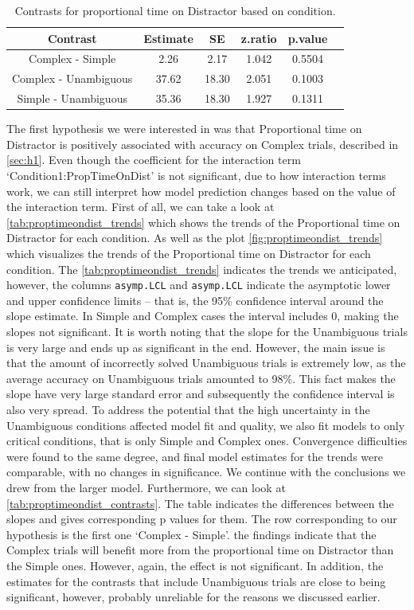 \begin{table}[h!]
\centering
\begin{tabular}{|c|c|c|c|c|c|}
\hline
\textbf{Contrast} & \textbf{Estimate} & \textbf{SE} & \textbf{z.ratio} & \textbf{p.value} \\ \hline
Complex - Simple & 2.26 & 2.17 & 1.042 & 0.5504 \\ \hline
Complex - Unambiguous & 37.62 & 18.30 & 2.051 & 0.1003 \\ \hline
Simple - Unambiguous & 35.36 & 18.30 & 1.927 & 0.1311 \\ \hline
\end{tabular}
\caption{Contrasts for proportional time on Distractor based on condition.}
\label{tab:proptimeondist_contrasts}
\end{table}

The first hypothesis we were interested in was that Proportional time on Distractor is positively associated with accuracy on Complex trials, described in \autoref{sec:h1}. Even though the coefficient for the interaction term `Condition1:PropTimeOnDist' is not significant, due to how interaction terms work, we can still interpret how model prediction changes based on the value of the interaction term. First of all, we can take a look at \autoref{tab:proptimeondist_trends} which shows the trends of the Proportional time on Distractor for each condition. As well as the plot \autoref{fig:proptimeondist_trends} which visualizes the trends of the Proportional time on Distractor for each condition. The \autoref{tab:proptimeondist_trends} indicates the trends we anticipated, however, the columns \texttt{asymp.LCL} and \texttt{asymp.LCL} indicate the asymptotic lower and upper confidence limits -- that is, the 95\% confidence interval around the slope estimate. In Simple and Complex cases the interval includes 0, making the slopes not significant. It is worth noting that the slope for the Unambiguous trials is very large and ends up as significant in the end. However, the main issue is that the amount of incorrectly solved Unambiguous trials is extremely low, as the average accuracy on Unambiguous trials amounted to 98\%. This fact makes the slope have very large standard error and subsequently the confidence interval is also very spread. To address the potential that the high uncertainty in the Unambiguous conditions affected model fit and quality, we also fit models to only critical conditions, that is only Simple and Complex ones. Convergence difficulties were found to the same degree, and final model estimates for the trends were comparable, with no changes in significance. We continue with the conclusions we drew from the larger model.
Furthermore, we can look at \autoref{tab:proptimeondist_contrasts}. The table indicates the differences between the slopes and gives corresponding p values for them. The row corresponding to our hypothesis is the first one `Complex - Simple'. the findings indicate that the Complex trials will benefit more from the proportional time on Distractor than the Simple ones. However, again, the effect is not significant. In addition, the estimates for the contrasts that include Unambiguous trials are close to being significant, however, probably unreliable for the reasons we discussed earlier.

